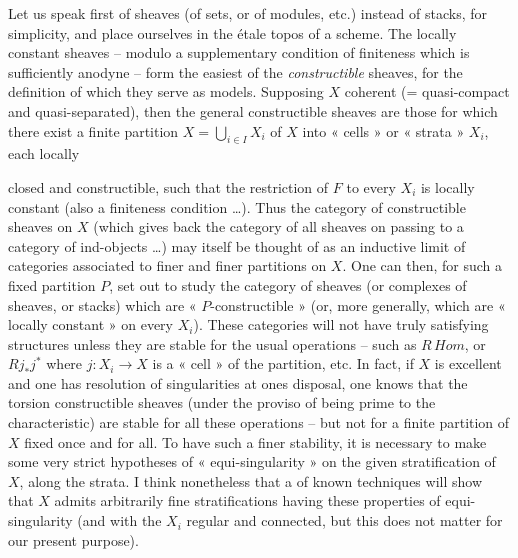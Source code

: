 \documentclass[11pt,a4paper]{article}
\begin{document}
Let us speak first of sheaves (of sets, or of modules, etc.) instead of stacks, for simplicity, and place ourselves in the étale topos of a scheme. The locally constant sheaves -- modulo a supplementary condition of finiteness which is sufficiently anodyne -- form the easiest of the \emph{constructible} sheaves, for the definition of which they serve as models. Supposing $X$ coherent (= quasi-compact and quasi-separated), then the general constructible sheaves are those for which there exist a finite partition $X = \bigcup_{i \in I} X_i$ of $X$ into « cells » or « strata » $X_i$, each locally

closed and constructible, such that the restriction of $F$ to every $X_i$ is locally constant (also a finiteness condition …). Thus the category of constructible sheaves on $X$ (which gives back the category of all sheaves on passing to a category of ind-objects …) may itself be thought of as an inductive limit of categories associated to finer and finer partitions on $X$. One can then, for such a fixed partition $P$, set out to study the category of sheaves (or complexes of sheaves, or stacks) which are « $P$-constructible » (or, more generally, which are « locally constant » on every $X_i$). These categories will not have truly satisfying structures unless they are stable for the usual operations -- such as $R\,\mathit{Hom}$, or $Rj_*j^*$ where $j : X_i \to X$ is a « cell » of the partition, etc. In fact, if $X$ is excellent and one has resolution of singularities at ones disposal, one knows that the torsion constructible sheaves (under the proviso of being prime to the characteristic) are stable for all these operations -- but not for a finite partition of $X$ fixed once and for all. To have such a finer stability, it is necessary to make some very strict hypotheses of « equi-singularity » on the given stratification of $X$, along the strata. I think nonetheless that a   of known techniques will show that $X$ admits arbitrarily fine stratifications having these properties of equi-singularity (and with the $X_i$ regular and connected, but this does not matter for our present purpose).
\end{document}
